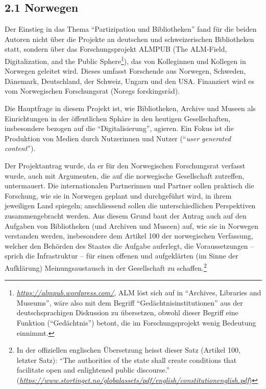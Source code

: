 \documentclass[a4paper,
fontsize=11pt,
oneside,
numbers=noperiodatend,
parskip=half-,
bibliography=totoc,
final
]{scrartcl}
\begin{document}
\subsection{2.1 Norwegen}\label{norwegen}

Der Einstieg in das Thema \enquote{Partizipation und Bibliotheken} fand
für die beiden Autoren nicht über die Projekte an deutschen und
schweizerischen Bibliotheken statt, sondern über das Forschungsprojekt
ALMPUB (The ALM-Field, Digitalization, and the Public Sphere\footnote{\href{https://almpub.wordpress.com/}{\emph{https://almpub.wordpress.com/}},
  ALM löst sich auf in \enquote{Archives, Libraries and Museums}, wäre
  also mit dem Begriff \enquote{Gedächtnisinstitutionen} aus der
  deutschsprachigen Diskussion zu übersetzen, obwohl dieser Begriff eine
  Funktion (\enquote{Gedächtnis}) betont, die im Forschungsprojekt wenig
  Bedeutung einnimmt.}), das von Kolleginnen und Kollegen in Norwegen
geleitet wird. Dieses umfasst Forschende aus Norwegen, Schweden,
Dänemark, Deutschland, der Schweiz, Ungarn und den USA. Finanziert wird
es vom Norwegischen Forschungsrat (Noregs forskingsråd).

Die Hauptfrage in diesem Projekt ist, wie Bibliotheken, Archive und
Museen als Einrichtungen in der öffentlichen Sphäre in den heutigen
Gesellschaften, insbesondere bezogen auf die \enquote{Digitalisierung},
agieren. Ein Fokus ist die Produktion von Medien durch Nutzerinnen und
Nutzer (\enquote{\emph{user generated content}}).

Der Projektantrag wurde, da er für den Norwegischen Forschungsrat
verfasst wurde, auch mit Argumenten, die auf die norwegische
Gesellschaft zutreffen, untermauert. Die internationalen Partnerinnen
und Partner sollen praktisch die Forschung, wie sie in Norwegen geplant
und durchgeführt wird, in ihrem jeweiligen Land spiegeln; anschliessend
sollen die unterschiedlichen Perspektiven zusammengebracht werden. Aus
diesem Grund baut der Antrag auch auf den Aufgaben von Bibliotheken (und
Archiven und Museen) auf, wie sie in Norwegen verstanden werden,
insbesondere dem Artikel 100 der norwegischen Verfassung, welcher den
Behörden des Staates die Aufgabe auferlegt, die Voraussetzungen --
sprich die Infrastruktur -- für einen offenen und aufgeklärten (im Sinne
der Aufklärung) Meinungsaustausch in der Gesellschaft zu
schaffen.\footnote{In der offiziellen englischen Übersetzung heisst
  dieser Satz (Artikel 100, letzter Satz): \enquote{The authorities of
  the state shall create conditions that facilitate open and enlightened
  public discourse.}
  (\href{https://www.stortinget.no/globalassets/pdf/english/constitutionenglish.pdf}{\emph{https://www.stortinget.no/globalassets/pdf/english/constitutionenglish.pdf}})}
\end{document}
